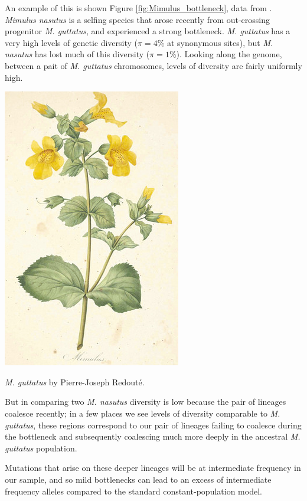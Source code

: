 An example of this is shown Figure
\ref{fig:Mimulus_bottleneck}, data from \citeauthor{brandvain:14}. {\it Mimulus nasutus} is a selfing
species that arose recently from out-crossing progenitor {\it M.
  guttatus}, and experienced a strong bottleneck. {\it M. guttatus} has a very high levels of genetic diversity
($\pi=4\%$ at synonymous sites), but {\it M. nasutus} has lost much 
of this diversity ($\pi =1\%$). Looking along the genome, between a
pait of {\it M. guttatus} chromosomes, levels of
diversity are fairly uniformly high.
\begin{marginfigure}
\begin{center}
  \includegraphics[width = 0.5 \textwidth]{illustration_images/Genetic_drift/Mimulus/Mimulus.png}
\end{center}
\caption{{\it M. guttatus} by Pierre-Joseph
  Redout\'e.} \label{fig:Human_growth}  %
\end{marginfigure}
 But in comparing two {\it
  M. nasutus} diversity is low because the pair of lineages coalesce
recently; in a few places we see levels of diversity comparable to
{\it M. guttatus}, these regions correspond to our pair of lineages
failing to coalesce during the bottleneck and subsequently coalescing
much more deeply in the ancestral {\it M. guttatus} population.


Mutations that arise on these deeper lineages will be at intermediate frequency in our sample, and so mild bottlenecks
can lead to an excess of intermediate frequency alleles compared to
the standard constant-population model. 


